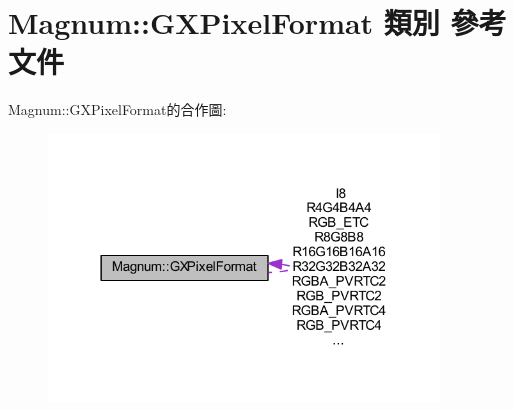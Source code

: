 \hypertarget{class_magnum_1_1_g_x_pixel_format}{}\section{Magnum\+:\+:G\+X\+Pixel\+Format 類別 參考文件}
\label{class_magnum_1_1_g_x_pixel_format}


Magnum\+:\+:G\+X\+Pixel\+Format的合作圖\+:\nopagebreak
\begin{figure}[H]
\begin{center}
\leavevmode
\includegraphics[width=294pt]{class_magnum_1_1_g_x_pixel_format__coll__graph}
\end{center}
\end{figure}
